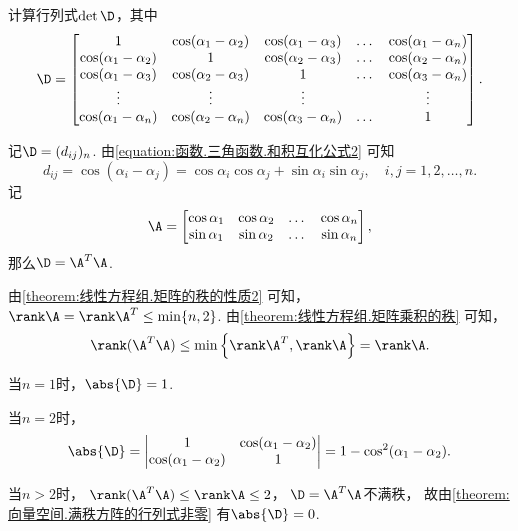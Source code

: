 \begin{example}
计算行列式\(\det\D\)，其中\[
\D = \begin{bmatrix}
	1 & \cos(\alpha_1-\alpha_2) & \cos(\alpha_1-\alpha_3) & \dots & \cos(\alpha_1-\alpha_n) \\
	\cos(\alpha_1-\alpha_2) & 1 & \cos(\alpha_2-\alpha_3) & \dots & \cos(\alpha_2-\alpha_n) \\
	\cos(\alpha_1-\alpha_3) & \cos(\alpha_2-\alpha_3) & 1 & \dots & \cos(\alpha_3-\alpha_n) \\
	\vdots & \vdots & \vdots & & \vdots \\
	\cos(\alpha_1-\alpha_n) & \cos(\alpha_2-\alpha_n) & \cos(\alpha_3-\alpha_n) & \dots & 1
\end{bmatrix}.
\]
\begin{solution}
记\(\D = (d_{ij})_n\).
由\cref{equation:函数.三角函数.和积互化公式2} 可知\[
	d_{ij} = \cos(\alpha_i-\alpha_j)
	= \cos\alpha_i\cos\alpha_j+\sin\alpha_i\sin\alpha_j,
	\quad i,j=1,2,\dotsc,n.
\]
记\[
	\A = \begin{bmatrix}
		\cos\alpha_1 & \cos\alpha_2 & \dots & \cos\alpha_n \\
		\sin\alpha_1 & \sin\alpha_2 & \dots & \sin\alpha_n
	\end{bmatrix},
\]那么\(\D = \A^T \A\).

由\cref{theorem:线性方程组.矩阵的秩的性质2} 可知，
\(\rank\A = \rank\A^T \leq \min\{n,2\}\).
由\cref{theorem:线性方程组.矩阵乘积的秩} 可知，\[
	\rank(\A^T\A) \leq \min\left\{\rank\A^T,\rank\A\right\} = \rank\A.
\]

当\(n=1\)时，\(\abs{\D}=1\).

当\(n=2\)时，\[
	\abs{\D}
	= \begin{vmatrix}
		1 & \cos(\alpha_1-\alpha_2) \\
		\cos(\alpha_1-\alpha_2) & 1
	\end{vmatrix}
	= 1 - \cos^2(\alpha_1-\alpha_2).
\]

当\(n>2\)时，
\(\rank(\A^T\A) \leq \rank\A \leq2\)，
\(\D = \A^T \A\)不满秩，
故由\cref{theorem:向量空间.满秩方阵的行列式非零} 有\(\abs{\D}=0\).
\end{solution}
\end{example}

